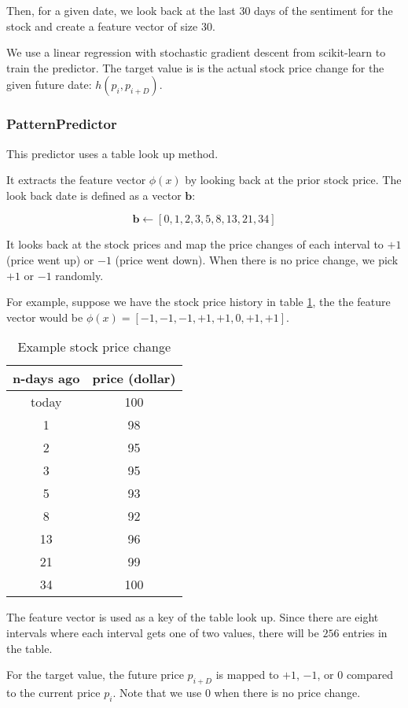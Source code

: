 \documentclass[twocolumn,10pt]{asme2ej}
\newcommand{\vect}[1]{\boldsymbol{#1}}
\begin{document}
Then, for a given date, we look back at the last 30 days of the sentiment
for the stock and create a feature vector of size 30.

We use a linear regression with stochastic gradient descent from
scikit-learn \cite{web:scikit_learn} to train the predictor. The
target value is is the actual stock price change for the given future
date: $h(p_i, p_{i+D})$.

\subsubsection{PatternPredictor}

This predictor uses a table look up method.

It extracts the feature vector $\phi(x)$ by looking back at the prior
stock price. The look back date is defined as a vector $\vect{b}$:

\[
\vect{b} \gets [0, 1, 2, 3, 5, 8, 13, 21, 34]
\]

It looks back at the stock prices and map the price changes of each
interval to $+1$ (price went up) or $-1$ (price went down). When there
is no price change, we pick $+1$ or $-1$ randomly.

For example, suppose we have the stock price history in table
\ref{patternStockExample}, the the feature vector would be
$\phi(x)=[-1,-1,-1,+1,+1,0,+1,+1]$.

\begin{table}
  \begin{tabular}{cc}
    n-days ago & price (dollar) \\
    \hline
    today & 100 \\
    1 & 98 \\
    2 & 95 \\
    3 & 95 \\
    5 & 93 \\
    8 & 92 \\
    13 & 96 \\
    21 & 99 \\
    34 & 100 \\
  \end{tabular}
  \caption{Example stock price change}
  \label{patternStockExample}
\end{table}

The feature vector is used as a key of the table look up. Since there
are eight intervals where each interval gets one of two values, there
will be $256$ entries in the table.

For the target value, the future price $p_{i+D}$ is mapped to $+1$,
$-1$, or $0$ compared to the current price $p_i$. Note that we use $0$
when there is no price change.
\end{document}
